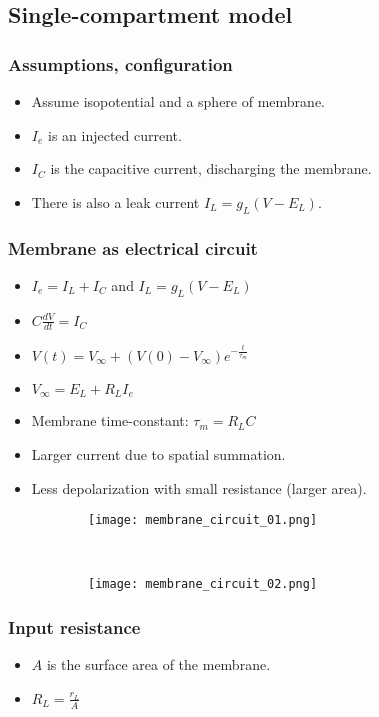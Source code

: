 \documentclass[main]{subfiles}
\begin{document}
\subsection{Single-compartment model}
\subsubsection{Assumptions, configuration}
\begin{itemize}[noitemsep,nolistsep]
	\item Assume isopotential and a sphere of membrane.
	\item $I_e$ is an injected current.
	\item $I_C$ is the capacitive current, discharging the membrane.
	\item There is also a leak current $I_L = g_L(V-E_L)$.
\end{itemize}

\subsubsection{Membrane as electrical circuit}
\begin{itemize}[noitemsep,nolistsep]
	\item $I_e = I_L + I_C$ and $I_L=g_L(V-E_L)$
	\item $C\frac{dV}{dt} = I_C$
	\item $V(t) = V_\infty+(V(0)-V_\infty)e^{-\frac{t}{\tau_m}}$
	\item $V_\infty = E_L + R_LI_e$
	\item Membrane time-constant: $\tau_m = R_LC$
	\item Larger current due to spatial summation.
	\item Less depolarization with small resistance (larger area).
\end{itemize}
\begin{figure}[H]
	\centering
	\begin{subfigure}[b]{0.3\textwidth}
		\centering
		\texttt{[image: membrane\_circuit\_01.png]}
	\end{subfigure}%
	~
	\begin{subfigure}[b]{0.5\textwidth}
		\centering
		\texttt{[image: membrane\_circuit\_02.png]}
	\end{subfigure}
\end{figure}

\subsubsection{Input resistance}
\begin{itemize}[noitemsep,nolistsep]
	\item $A$ is the surface area of the membrane.
	\item $R_L = \frac{r_L}{A}$
\end{itemize}
\end{document}
